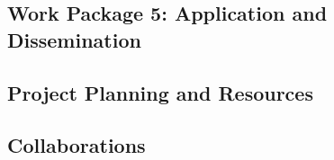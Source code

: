 \documentclass{llncs}
\begin{document}
\subsection{Work Package 5: Application and Dissemination}
\label{sec:wp5} 
 


\subsection{Project Planning and Resources}
\label{sec:planning}
 

\subsection{Collaborations}
\label{sec:collaborations}
 




% 
\end{document}
